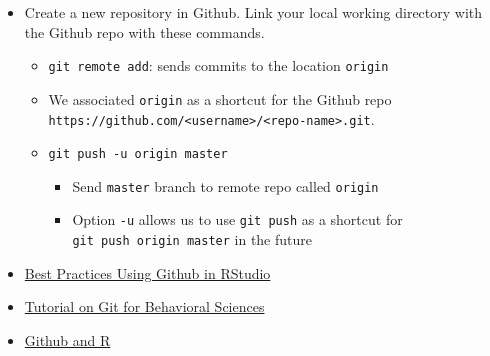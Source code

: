 \documentclass[]{book}
\providecommand{\tightlist}{%
  \setlength{\itemsep}{0pt}\setlength{\parskip}{0pt}}
\begin{document}
\begin{itemize}
\item
  Create a new repository in Github. Link your local working directory with the Github repo with these commands.

  \begin{itemize}
  \tightlist
  \item
    \texttt{git\ remote\ add}: sends commits to the location \texttt{origin}
  \item
    We associated \texttt{origin} as a shortcut for the Github repo \texttt{https://github.com/\textless{}username\textgreater{}/\textless{}repo-name\textgreater{}.git}.
  \item
    \texttt{git\ push\ -u\ origin\ master}

    \begin{itemize}
    \tightlist
    \item
      Send \texttt{master} branch to remote repo called \texttt{origin}
    \item
      Option \texttt{-u} allows us to use \texttt{git\ push} as a shortcut for \texttt{git\ push\ origin\ master} in the future
    \end{itemize}
  \end{itemize}
\item
  \href{http://r-pkgs.had.co.nz/git.html}{Best Practices Using Github in RStudio}
\item
  \href{https://vuorre.netlify.com/pdf/2017-Vuorre-Curley.pdf}{Tutorial on Git for Behavioral Sciences}
\item
  \href{https://happygitwithr.com/}{Github and R}
\end{itemize}


\end{document}
